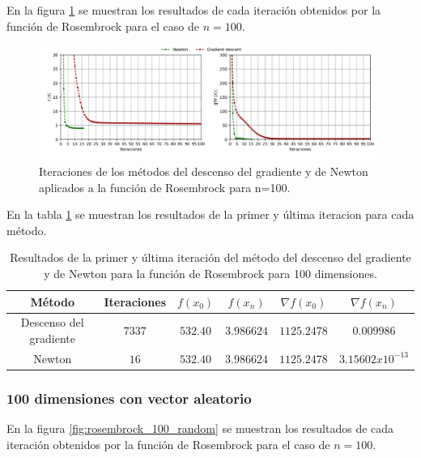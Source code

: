 En la figura \ref{fig:rosembrock_100} se muestran los resultados de cada iteración obtenidos por la función de Rosembrock para el caso de $n=100$.

\begin{figure}[H]
    \centering
    \includegraphics[width=17cm]{Graphics/Problema_2/rosembrock_100_predefined.png}
    \caption{Iteraciones de los métodos del descenso del gradiente y de Newton aplicados a la función de Rosembrock para n=100.}
    \label{fig:rosembrock_100}
\end{figure}

En la tabla \ref{table:rosembrock_100} se muestran los resultados de la primer y última iteracion para cada método.

\begin{table}[H]
    \centering
    \begin{tabular}{cccccc} \hline
        Método                 & Iteraciones & $f(x_0)$  & $f(x_n)$   & $\nabla f(x_0)$ & $\nabla f(x_n) $   \\ \hline
        Descenso del gradiente & $7337$      & $532.40 $ & $3.986624$ & $1125.2478$     & $0.009986$         \\
        Newton                 & $16$        & $532.40$  & $3.986624$ & $1125.2478$     & $3.15602x10^{-13}$ \\ \hline
    \end{tabular}
    \caption{Resultados de la primer y última iteración del método del descenso del gradiente y de Newton para la función de Rosembrock para 100 dimensiones.}
    \label{table:rosembrock_100}
\end{table}

\subsubsection{100 dimensiones con vector aleatorio}

En la figura \ref{fig:rosembrock_100_random} se muestran los resultados de cada iteración obtenidos por la función de Rosembrock para el caso de $n=100$.

